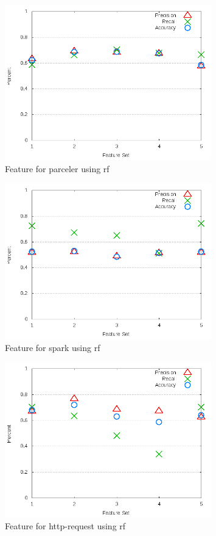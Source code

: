 \begin{figure}[!t]
\centering
\includegraphics[width=0.8\textwidth]{images/rf/test_3/parceler_sample_range.png}
\caption{Feature for parceler using \gls{rf}}
\label{fig:test_3_parceler_rf}
\end{figure}

\clearpage
\begin{figure}[!t]
\centering
\includegraphics[width=0.8\textwidth]{images/rf/test_3/spark_sample_range.png}
\caption{Feature for spark using \gls{rf}}
\label{fig:test_3_spark_rf}
\end{figure}

\begin{figure}[!t]
\centering
\includegraphics[width=0.8\textwidth]{images/rf/test_3/http-request_sample_range.png}
\caption{Feature for http-request using \gls{rf}}
\label{fig:test_3_http-request_rf}
\end{figure}

